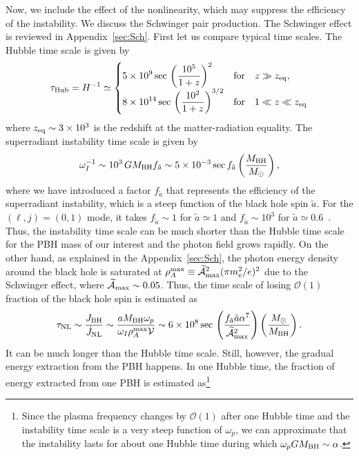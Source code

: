 \documentclass[%
 preprint,
 nofootinbib,
 amsmath,amssymb,
 aps,
 a4paper
]{revtex4-1}
\begin{document}
Now, we include the effect of the nonlinearity, which may suppress the efficiency of the instability. We discuss the Schwinger pair production. The Schwinger effect is reviewed in Appendix~\ref{sec:Sch}.
First let us compare typical time scales. The Hubble time scale is given by
\begin{align}
	\tau_{\rm Hub} = H^{-1} \simeq
	\begin{cases}
	\displaystyle 5\times 10^{9}\,{\rm sec}\,\left(\frac{10^5}{1+z}\right)^2
	 & {\rm for}~~~z\gg z_{\rm eq},\\
	 \displaystyle 8\times 10^{14}\,{\rm sec}\,\left(\frac{10^2}{1+z}\right)^{3/2} & {\rm for}~~~1\ll z\ll z_{\rm eq}
	 \end{cases}
\end{align}
where $z_{\rm eq} \sim 3\times 10^3$ is the redshift at the matter-radiation equality. The superradiant instability time scale is given by
\begin{align}
	\omega_I^{-1} \sim 10^3\,GM_{\rm BH} f_{\tilde a} \sim 5\times 10^{-3}\,{\rm sec}\,f_{\tilde a}\left( \frac{M_{\rm BH}}{M_{\odot}} \right),
\end{align}
where we have introduced a factor $f_{\tilde a}$ that represents the efficiency of the superradiant instability, which is a steep function of the black hole spin $\tilde a$.
For the $(\ell,j)=(0,1)$ mode, it takes $f_{\tilde a} \sim 1$ for $\tilde a\simeq 1$ and $f_{\tilde a} \sim 10^{3}$ for $\tilde a \simeq 0.6$~\cite{Dolan:2018dqv}.
Thus, the instability time scale can be much shorter than the Hubble time scale for the PBH mass of our interest and the photon field grows rapidly.
On the other hand, as explained in the Appendix~\ref{sec:Sch}, the photon energy density around the black hole is saturated at $\rho_A^{\rm max} \equiv \widetilde{\mathcal A}_{\rm max}^2(\pi m_e^2/e)^2$ due to the Schwinger effect, where $ \widetilde{\mathcal A}_{\rm max} \sim 0.05$.
Thus, the time scale of losing $\mathcal O(1)$ fraction of the black hole spin is estimated as
\begin{align}
	\tau_{\rm NL} \sim \frac{J_{\rm BH}}{\dot J_{\rm NL}}\sim \frac{a M_{\rm BH} \omega_p}{\omega_I \rho_A^{\rm max} \mathcal V} \sim 6\times 10^{8}\,{\rm sec}\,\left(\frac{f_{\tilde a}\tilde a \alpha^7}{\widetilde{\mathcal A}_{\rm max}^2}\right)\left( \frac{M_\odot}{M_{\rm BH}} \right).
\end{align}
It can be much longer than the Hubble time scale. Still, however, the gradual energy extraction from the PBH happens. In one Hubble time, the fraction of energy extracted from one PBH is estimated as\footnote{
	Since the plasma frequency changes by $\mathcal O(1)$ after one Hubble time and the instability time scale is a very steep function of $\omega_p$, we can approximate that the instability lasts for about one Hubble time during which $\omega_p GM_{\rm BH} \sim \alpha$.
}
\end{document}
